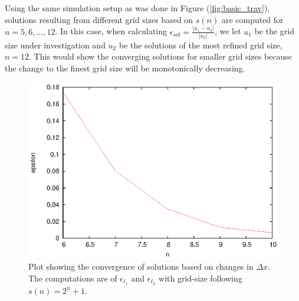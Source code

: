   Using the same simulation setup as was done in Figure (\ref{fig:basic_trav}), solutions resulting from different grid sizes based on $s(n)$ are computed for $n = 5, 6, \ldots, 12$.
  In this case, when calculating $\epsilon_{sol} = \frac{| u_1 - u_2 |}{|u_2|}$, we let $u_1$ be the grid size under investigation and $u_2$ be the solutions of the most refined grid size, $n = 12$.
  This would show the converging solutions for smaller grid sizes because the change to the finest grid size will be monotonically decreasing.

  \begin{figure}
    \centering
    \includegraphics{converge_spatial}
    \caption{Plot showing the convergence of solutions based on changes in $\Delta x$. The computations are of $\epsilon_{\ell_1}$ and $\epsilon_{\ell_2}$ with grid-size following $s(n) = 2^{n}+1$.}
    \label{fig:converge_spatial}
  \end{figure}

